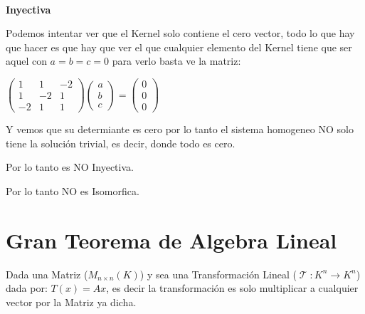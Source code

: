 \documentclass[12pt]{report}                                %
\DeclareMathOperator \LinealTransformation {\mathcal{T}}
\begin{document}
            \textbf{\\Inyectiva}

            Podemos intentar ver que el Kernel solo contiene el cero vector, todo lo que hay que hacer es
            que hay que ver el que cualquier elemento del Kernel tiene que ser aquel con $a=b=c=0$
            para verlo basta ve la matriz:

            $\begin{pmatrix}1&1&-2\\1&-2&1\\-2&1&1\end{pmatrix} \begin{pmatrix}a\\b\\c\end{pmatrix}=
                \begin{pmatrix}0\\0\\0\end{pmatrix}$

            Y vemos que su determiante es cero por lo tanto el sistema homogeneo NO solo
            tiene la solución trivial, es decir, donde todo es cero.

            Por lo tanto es NO Inyectiva.

            Por lo tanto NO es Isomorfica.


    \clearpage
    \section{Gran Teorema de Algebra Lineal}

        Dada una Matriz ($M_{n \times n} (K)$) y sea una Transformación Lineal
        ($\LinealTransformation : K^n \to K^n$) dada por: $T(x) = Ax$, es decir
        la transformación es solo multiplicar a cualquier vector por la Matriz ya 
        dicha.
\end{document}
